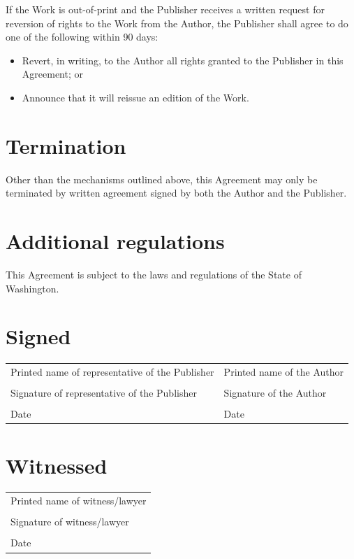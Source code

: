 \documentclass[12pt,letterpaper]{article}
\begin{document}
If the Work is out-of-print and the Publisher receives a written request for reversion of rights to the Work from the Author, the Publisher shall agree to do one of the following within 90 days:

\begin{itemize}
    \item Revert, in writing, to the Author all rights granted to the Publisher in this Agreement; or
    \item Announce that it will reissue an edition of the Work.
\end{itemize}

\section{Termination}

Other than the mechanisms outlined above, this Agreement may only be terminated by written agreement signed by both the Author and the Publisher.

\section{Additional regulations}

This Agreement is subject to the laws and regulations of the State of Washington.

\newpage

\thispagestyle{final}

\section*{Signed}

\begin{tabular}{p{3in} | p{3in}}
    \vspace{0.5in} & \\ \hline
    Printed name of representative of the Publisher & Printed name of the Author \\
    \vspace{0.5in} & \\ \hline
    Signature of representative of the Publisher & Signature of the Author \\
    \vspace{0.5in} & \\ \hline
    Date & Date \\
\end{tabular}

\section*{Witnessed}

\begin{tabular}{l}
    \vspace{0.5in} \\ \hline
    Printed name of witness/lawyer \\
    \vspace{0.5in} \\ \hline
    Signature of witness/lawyer \\
    \vspace{0.5in} \\ \hline
    Date \\
\end{tabular}
\end{document}
